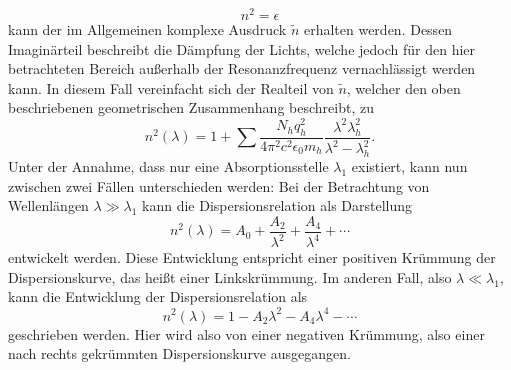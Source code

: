 \begin{equation}
  n^2 = \epsilon
\end{equation}
kann der im Allgemeinen komplexe Ausdruck $\tilde{n}$ erhalten werden.
Dessen Imaginärteil beschreibt die Dämpfung der Lichts, welche jedoch für den hier betrachteten Bereich außerhalb der Resonanzfrequenz vernachlässigt werden kann.
In diesem Fall vereinfacht sich der Realteil von $\tilde{n}$, welcher den oben beschriebenen geometrischen Zusammenhang beschreibt, zu
\begin{equation}
  n^2(\lambda) = 1 + \sum \frac{N_h q_h^2}{4 \pi^2 c^2 \epsilon_0 m_h} \frac{\lambda^2 \lambda_h^2}{\lambda^2 - \lambda_h^2}.
\end{equation}
Unter der Annahme, dass nur eine Absorptionsstelle $\lambda_1$ existiert, kann nun zwischen zwei Fällen unterschieden werden:
Bei der Betrachtung von Wellenlängen $\lambda \gg \lambda_1$ kann die Dispersionsrelation als Darstellung
\begin{equation}
  n^2(\lambda) = A_0 + \frac{A_2}{\lambda^2} + \frac{A_4}{\lambda^4} + \dotsb
  \label{eqn:d1}
\end{equation}
entwickelt werden.
Diese Entwicklung entspricht einer positiven Krümmung der Dispersionskurve, das heißt einer Linkskrümmung.
Im anderen Fall, also $\lambda \ll \lambda_1$, kann die Entwicklung der Dispersionsrelation als
\begin{equation}
  n^2(\lambda) =  1 - A_2 \lambda^2 - A_4 \lambda^4 - \dotsb
  \label{eqn:d2}
\end{equation}
geschrieben werden.
Hier wird also von einer negativen Krümmung, also einer nach rechts gekrümmten Dispersionskurve ausgegangen.
